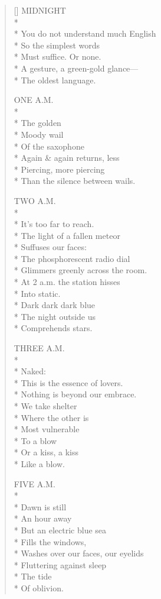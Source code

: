 \label{ch:night_early}
\settowidth{\versewidth}{Washes over our faces, our eyelids}
\begin{verse}[\versewidth]
MIDNIGHT\\*
~\\*
You do not understand much English\\*
So the simplest words\\*
Must suffice.     Or none.\\*
A gesture, a green-gold glance---\\*
The oldest language.

ONE A.M.\\*
~\\*
The golden\\*
Moody wail\\*
Of the saxophone\\*
Again \& again returns, less\\*
Piercing, more piercing\\*
Than the silence between wails.

TWO A.M.\\*
~\\*
It's too far to reach.\\*
The light of a fallen meteor\\*
Suffuses our faces:\\*
The phosphorescent radio dial\\*
Glimmers greenly across the room.\\*
At 2 a.m. the station hisses\\*
Into static.\\*
Dark dark dark blue\\*
The night outside us\\*
Comprehends stars.

THREE A.M.\\*
~\\*
Naked:\\*
This is the essence of lovers.\\*
Nothing is beyond our embrace.\\*
We take shelter\\*
Where the other is\\*
Most vulnerable\\*
To a blow\\*
Or a kiss, a kiss\\*
Like a blow.

FIVE A.M.\\*
~\\*
Dawn is still\\*
An hour away\\*
But an electric blue sea\\*
Fills the windows,\\*
Washes over our faces, our eyelids\\*
Fluttering against sleep\\*
The tide\\*
Of oblivion.


\end{verse}

